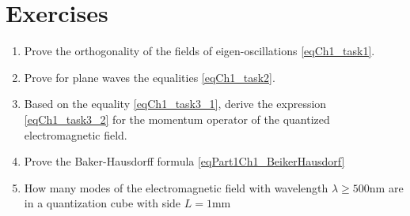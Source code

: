 \section{Exercises}
\begin{enumerate}
\item Prove the orthogonality of the fields of eigen-oscillations
  \eqref{eqCh1_task1}.  
\item Prove for plane waves the equalities \eqref{eqCh1_task2}.
\item Based on the equality \eqref{eqCh1_task3_1}, derive the expression
  \eqref{eqCh1_task3_2} for the momentum operator of the quantized
  electromagnetic field. 
\item Prove the Baker-Hausdorff formula \eqref{eqPart1Ch1_BeikerHausdorf}
\item How many modes \label{qQuantelNumberMods} of the electromagnetic field with
  wavelength $\lambda \ge 500 \mbox{nm}$ are in a quantization cube with side $L=1 \mbox{mm}$
  \cite{courseIntroQuantumOpticsCoursera} 
\end{enumerate}